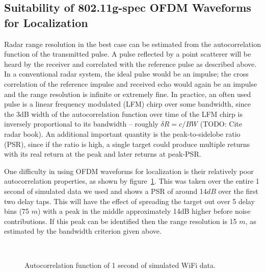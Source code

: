 \documentclass[article,11pt,onecolumn,final]{IEEEtran}
\begin{document}
\subsection{Suitability of 802.11g-spec OFDM Waveforms for Localization}
Radar range resolution in the best case can be estimated from the autocorrelation function of the transmitted pulse. A pulse reflected by a point scatterer will be heard by the receiver and correlated with the reference pulse as described above. In a conventional radar system, the ideal pulse would be an impulse; the cross correlation of the reference impulse and received echo would again be an impulse and the range resolution is infinite or extremely fine. In practice, an often used pulse is a linear frequency modulated (LFM) chirp over some bandwidth, since the 3dB width of the autocorrelation function over time of the LFM chirp is inversely proportional to its bandwidth -- roughly $\delta R = c / BW$ (TODO: Cite radar book). An additional important quantity is the peak-to-sidelobe ratio (PSR), since if the ratio is high, a single target could produce multiple returns with its real return at the peak and later returns at peak-PSR.

One difficulty in using OFDM waveforms for localization is their relatively poor autocorrelation properties, as shown by figure~\ref{fig:autocorr}. This was taken over the entire 1 second of simulated data we used and shows a PSR of around 14$dB$ over the first two delay taps. This will have the effect of spreading the target out over 5 delay bins (75 $m$) with a peak in the middle approximately 14dB higher before noise contributions. If this peak can be identified then the range resolution is 15 $m$, as estimated by the bandwidth criterion given above. 

\begin{figure}
	\caption{Autocorrelation function of 1 second of simulated WiFi data.}
	\centering
	\includegraphics[width=0.5]{figures/autocorr.png}
	\label{fig:autocorr}
\end{figure}
\end{document}

